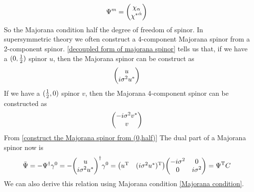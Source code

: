 \begin{equation}\label{decoupled form of majorana spinor}
\Psi^{m} = \mqty(\chi_{\a} \\ \lc^{\doa})
\end{equation}
So the Majorana condition half the degree of freedom of spinor. 
In supersymmetric theory we often construct a 4-component Majorana spinor from a 2-component spinor. \eqref{decoupled form of majorana spinor} tells us that, if we have a $(0,\frac{1}{2})$ spinor $u$, then the Majorana spinor can be construct as
\begin{equation}\label{construct the Majorana spinor from (0,half)}
\mqty(u \\ i\s^{2}u^*)
\end{equation}
If we have a $(\frac{1}{2},0)$ spinor $v$, then the Majorana 4-component spinor can be constructed as
\begin{equation}
\mqty(-i\s^{2}v^*\\v)
\end{equation}
From \eqref{construct the Majorana spinor from (0,half)}
The dual part of a Majorana spinor now is
\begin{equation}
\bar{\Psi}
=-\Psi^{\dagger}\g^{0}
= -\mqty(u \\ i\s^{2}u^*)^{\dagger}\g^{0}
=\mqty(u^{\tra} & (i\s^{2}u^{*})^{\tra})
\mqty(-i\s^2 & 0 \\
      0     & i\s^2)
=\Psi^{\tra}C 
\end{equation} 
We can also derive this relation using Majorana condition \eqref{Majorana condition}.

